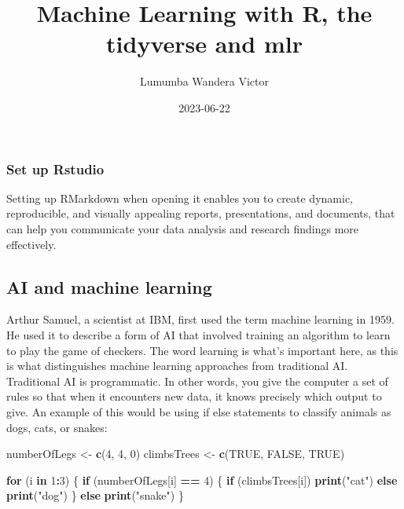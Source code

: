 \documentclass[
]{article}
\title{Machine Learning with R, the tidyverse and mlr}
\author{Lumumba Wandera Victor}
\date{2023-06-22}
\newenvironment{Shaded}{\begin{snugshade}}{\end{snugshade}}
\newcommand{\ConstantTok}[1]{\textcolor[rgb]{0.56,0.35,0.01}{#1}}
\newcommand{\ControlFlowTok}[1]{\textcolor[rgb]{0.13,0.29,0.53}{\textbf{#1}}}
\newcommand{\DecValTok}[1]{\textcolor[rgb]{0.00,0.00,0.81}{#1}}
\newcommand{\FunctionTok}[1]{\textcolor[rgb]{0.13,0.29,0.53}{\textbf{#1}}}
\newcommand{\NormalTok}[1]{#1}
\newcommand{\OtherTok}[1]{\textcolor[rgb]{0.56,0.35,0.01}{#1}}
\newcommand{\SpecialCharTok}[1]{\textcolor[rgb]{0.81,0.36,0.00}{\textbf{#1}}}
\newcommand{\StringTok}[1]{\textcolor[rgb]{0.31,0.60,0.02}{#1}}
\begin{document}
\maketitle

{
\setcounter{tocdepth}{2}
\tableofcontents
}
\subsubsection{Set up Rstudio}\label{set-up-rstudio}

Setting up RMarkdown when opening it enables you to create dynamic,
reproducible, and visually appealing reports, presentations, and
documents, that can help you communicate your data analysis and research
findings more effectively.

\subsection{AI and machine learning}\label{ai-and-machine-learning}

Arthur Samuel, a scientist at IBM, first used the term machine learning
in 1959. He used it to describe a form of AI that involved training an
algorithm to learn to play the game of checkers. The word learning is
what's important here, as this is what distinguishes machine learning
approaches from traditional AI. Traditional AI is programmatic. In other
words, you give the computer a set of rules so that when it encounters
new data, it knows precisely which output to give. An example of this
would be using if else statements to classify animals as dogs, cats, or
snakes:

\begin{Shaded}
\begin{Highlighting}[]
\NormalTok{numberOfLegs }\OtherTok{\textless{}{-}} \FunctionTok{c}\NormalTok{(}\DecValTok{4}\NormalTok{, }\DecValTok{4}\NormalTok{, }\DecValTok{0}\NormalTok{)}
\NormalTok{climbsTrees }\OtherTok{\textless{}{-}} \FunctionTok{c}\NormalTok{(}\ConstantTok{TRUE}\NormalTok{, }\ConstantTok{FALSE}\NormalTok{, }\ConstantTok{TRUE}\NormalTok{)}

\ControlFlowTok{for}\NormalTok{ (i }\ControlFlowTok{in} \DecValTok{1}\SpecialCharTok{:}\DecValTok{3}\NormalTok{) \{}
  \ControlFlowTok{if}\NormalTok{ (numberOfLegs[i] }\SpecialCharTok{==} \DecValTok{4}\NormalTok{) \{}
\ControlFlowTok{if}\NormalTok{ (climbsTrees[i]) }\FunctionTok{print}\NormalTok{(}\StringTok{"cat"}\NormalTok{) }\ControlFlowTok{else} \FunctionTok{print}\NormalTok{(}\StringTok{"dog"}\NormalTok{)}
\NormalTok{    \} }\ControlFlowTok{else} \FunctionTok{print}\NormalTok{(}\StringTok{"snake"}\NormalTok{)}
\NormalTok{\}}
\end{Highlighting}
\end{Shaded}
\end{document}

